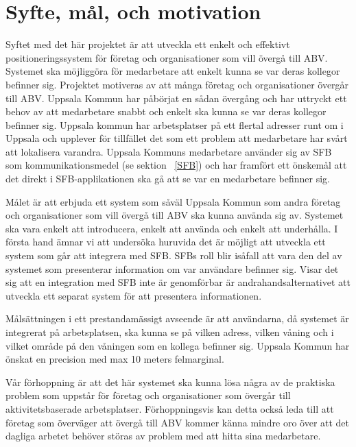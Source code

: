 \documentclass[a4paper,12pt]{article}
\begin{document}

 \section{Syfte, mål, och motivation}\label{syfte_mal_mot}
 Syftet med det här projektet är att utveckla ett enkelt och effektivt positioneringssystem för företag och organisationer som vill övergå till ABV. Systemet ska möjliggöra för medarbetare att enkelt kunna se var deras kollegor befinner sig. Projektet motiveras av att många företag och organisationer övergår till ABV. Uppsala Kommun har påbörjat en sådan övergång och har uttryckt ett behov av att medarbetare snabbt och enkelt ska kunna se var deras kollegor befinner sig. Uppsala kommun har arbetsplatser på ett flertal adresser runt om i Uppsala och upplever för tillfället det som ett problem att medarbetare har svårt att lokalisera varandra.
 Uppsala Kommuns medarbetare använder sig av SFB som kommunikationsmedel (se sektion ~\ref{SFB}) och har framfört ett önskemål att det direkt i SFB-applikationen ska gå att se var en medarbetare befinner sig.

 Målet är att erbjuda ett system som såväl Uppsala Kommun som andra företag och organisationer som vill övergå till ABV ska kunna använda sig av. Systemet ska vara enkelt att introducera, enkelt att använda och enkelt att underhålla.
 I första hand ämnar vi att undersöka huruvida det är möjligt att utveckla ett system som går att integrera med SFB. SFBs roll blir isåfall att vara den del av systemet som presenterar information om var användare befinner sig. Visar det sig att en integration med SFB inte är genomförbar är andrahandsalternativet att utveckla ett separat system för att presentera informationen.

 Målsättningen i ett prestandamässigt avseende är att användarna, då systemet är integrerat på arbetsplatsen, ska kunna se på vilken adress, vilken våning och i vilket område på den våningen som en kollega befinner sig. Uppsala Kommun har önskat en precision med max 10 meters felmarginal.

 Vår förhoppning är att det här systemet ska kunna lösa några av de praktiska problem som uppstår för företag och organisationer som övergår till aktivitetsbaserade arbetsplatser. Förhoppningsvis kan detta också leda till att företag som överväger att övergå till ABV kommer känna mindre oro över att det dagliga arbetet behöver störas av problem med att hitta sina medarbetare.
\end{document}
